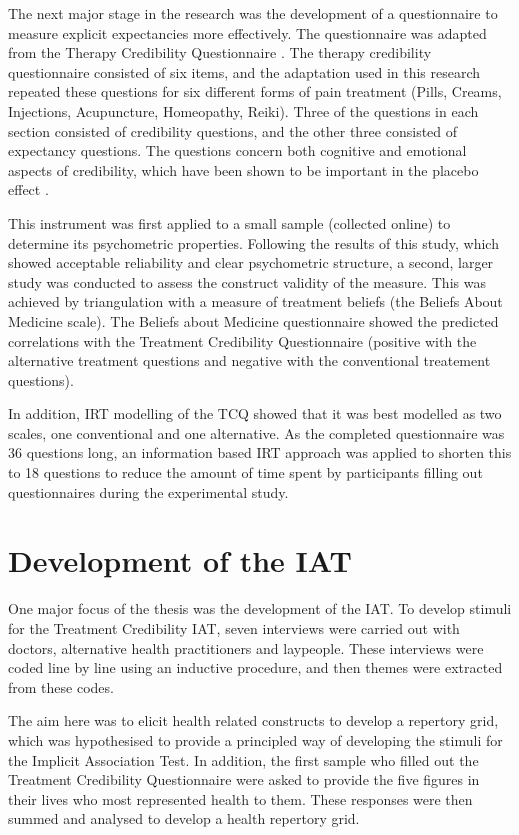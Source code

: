 \documentclass{article}
\begin{document}
The next major stage in the research was the development of a questionnaire to measure explicit expectancies more effectively. The questionnaire was adapted from the Therapy Credibility Questionnaire \citep{Devilly2000}. The therapy credibility questionnaire consisted of six items, and the adaptation used in this research repeated these questions for six different forms of pain treatment (Pills, Creams, Injections, Acupuncture, Homeopathy, Reiki). Three of the questions in each section consisted of credibility questions, and the other three consisted of expectancy questions. The questions concern both cognitive and emotional aspects of credibility, which have been shown to be important in the placebo effect  \citep{Blasi2001}. 

This instrument was first applied to a small sample (collected online) to determine its psychometric properties. Following the results of this study, which showed acceptable reliability and clear psychometric structure, a second, larger study was conducted to assess the construct validity of the measure. This was achieved by triangulation with a measure of treatment beliefs (the Beliefs About Medicine scale). The Beliefs about Medicine questionnaire showed the predicted correlations with the Treatment Credibility Questionnaire (positive with the alternative treatment questions and negative with the conventional treatement questions). 

In addition, IRT modelling of the TCQ showed that it was best modelled as two scales, one conventional and one alternative. As the completed questionnaire was 36 questions long, an information based IRT approach was applied to shorten this to 18 questions to reduce the amount of time spent by participants filling out questionnaires during the experimental study. 

\section{Development of the IAT}
\label{sec:development-iat}

One major focus of the thesis was the development of the IAT. To develop stimuli for the Treatment Credibility IAT, seven interviews were carried out with doctors, alternative health practitioners and laypeople. These interviews were coded line by line using an inductive procedure, and then themes were extracted from these codes. 

The aim here was to elicit health related constructs to develop a repertory grid, which was hypothesised to provide a principled way of developing the stimuli for the Implicit Association Test. In addition, the first sample who filled out the Treatment Credibility Questionnaire were asked to provide the five figures in their lives who most represented health to them. These responses were then summed and analysed to develop a health repertory grid. 
\end{document}
